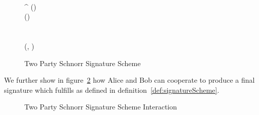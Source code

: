 \begin{figure}
\begin{center}
{\begin{varwidth}{\textwidth}
{            \varSchnorrChallenge \opAssign \funHash{\varMsg \opConc \varRand \opConc \varPubKeyComp} \\
            \pcreturn \funGen{\varSBob} \opEq \varRandBob^{\varSchnorrChallenge} \opAddPoint \varPubKeyBob
            }
            \procedure[linenumbering]{$\procFinSig{\varSigAlice}{\varSigBob}$} {
            (\varSAlice \opSeperate \varRandAlice \opSeperate \varRandBob) \opFunResult \varSigAlice \\
            (\varSBob \opSeperate \varRandAlice \opSeperate \varRandBob) \opFunResult \varSigBob \\
            \varRand \opAssign \varRandAlice \opAddPoint \varRandBob \\
            \varS \opAssign \varSAlice \opAddScalar \varSBob \\
            \varSigFin \opAssign (\varS, \varRand) \\
            \pcreturn \varSigFin
            }
        \end{varwidth}
        }
    \end{center}
    \caption{Two Party Schnorr Signature Scheme}
    \label{fig:twoparty-schnorr}
\end{figure}

We further show in figure~\ref{fig:twoparty-schnorr-prot} how Alice and Bob can cooperate to produce a final signature which fulfills \cnstCorrectness as defined in definition~\ref{def:signatureScheme}.

\begin{figure}
    \centering
    \caption{Two Party Schnorr Signature Scheme Interaction}
    \label{fig:twoparty-schnorr-prot}
\end{figure}

